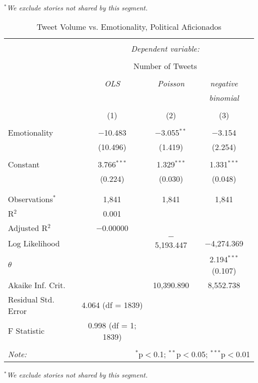 \emph{$^{*}$We exclude stories not shared by this segment.} 
\newpage 
\begin{table}[!htbp] \centering 
  \caption{Tweet Volume vs. Emotionality, Political Aficionados} 
  \label{} 
\begin{tabular}{@{\extracolsep{5pt}}lccc} 
\\[-1.8ex]\hline 
\hline \\[-1.8ex] 
 & \multicolumn{3}{c}{\textit{Dependent variable:}} \\ 
\cline{2-4} 
\\[-1.8ex] & \multicolumn{3}{c}{Number of Tweets} \\ 
\\[-1.8ex] & \textit{OLS} & \textit{Poisson} & \textit{negative} \\ 
 & \textit{} & \textit{} & \textit{binomial} \\ 
\\[-1.8ex] & (1) & (2) & (3)\\ 
\hline \\[-1.8ex] 
 Emotionality & $-$10.483 & $-$3.055$^{**}$ & $-$3.154 \\ 
  & (10.496) & (1.419) & (2.254) \\ 
  & & & \\ 
 Constant & 3.766$^{***}$ & 1.329$^{***}$ & 1.331$^{***}$ \\ 
  & (0.224) & (0.030) & (0.048) \\ 
  & & & \\ 
\hline \\[-1.8ex] 
Observations$^{*}$ & 1,841 & 1,841 & 1,841 \\ 
R$^{2}$ & 0.001 &  &  \\ 
Adjusted R$^{2}$ & $-$0.00000 &  &  \\ 
Log Likelihood &  & $-$5,193.447 & $-$4,274.369 \\ 
$\theta$ &  &  & 2.194$^{***}$  (0.107) \\ 
Akaike Inf. Crit. &  & 10,390.890 & 8,552.738 \\ 
Residual Std. Error & 4.064 (df = 1839) &  &  \\ 
F Statistic & 0.998 (df = 1; 1839) &  &  \\ 
\hline 
\hline \\[-1.8ex] 
\textit{Note:}  & \multicolumn{3}{r}{$^{*}$p$<$0.1; $^{**}$p$<$0.05; $^{***}$p$<$0.01} \\ 
\end{tabular} 
\end{table}
\emph{$^{*}$We exclude stories not shared by this segment.} 
\newpage 

